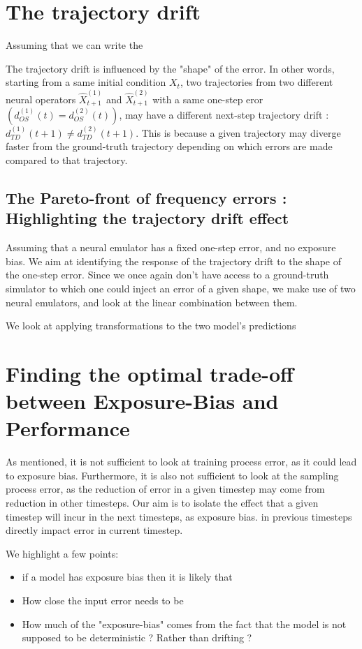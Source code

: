 \documentclass{article}
\begin{document}
\section{The trajectory drift}

Assuming that we can write the 

The trajectory drift is influenced by the "shape" of the error. In other words, starting from a same initial condition $X_t$, two trajectories from two different neural operators $\hat{X}_{t+1}^{(1)}$ and $\hat{X}_{t+1}^{(2)}$ with a same one-step eror $\left(d_{OS}^{(1)}(t) = d_{OS}^{(2)}(t)\right)$, may have a different next-step trajectory drift : $d_{TD}^{(1)}(t+1) \neq d_{TD}^{(2)}(t+1)$. This is because a given trajectory may diverge faster from the ground-truth trajectory depending on which errors are made compared to that trajectory.

\subsection{The Pareto-front of frequency errors : Highlighting the trajectory drift effect}

Assuming that a neural emulator has a fixed one-step error, and no exposure bias. We aim at identifying the response of the trajectory drift to the shape of the one-step error. Since we once again don't have access to a ground-truth simulator to which one could inject an error of a given shape, we make use of two neural emulators, and look at the linear combination between them.

We look at applying transformations to the two model's predictions


\section{Finding the optimal trade-off between Exposure-Bias and Performance} 

As mentioned, it is not sufficient to look at training process error, as it could lead to exposure bias.
Furthermore, it is also not sufficient to look at the sampling process error, as the reduction of error in a given timestep may come from reduction in other timesteps. Our aim is to isolate the effect that a given timestep will incur in the next timesteps, as exposure bias. in previous timesteps directly impact error in current timestep.

We highlight a few points:
\begin{itemize}
    \item if a model has exposure bias then it is likely that 
    \item How close the input error needs to be 
    \item How much of the "exposure-bias" comes from the fact that the model is not supposed to be deterministic ? Rather than drifting ? 
\end{itemize}
\end{document}
